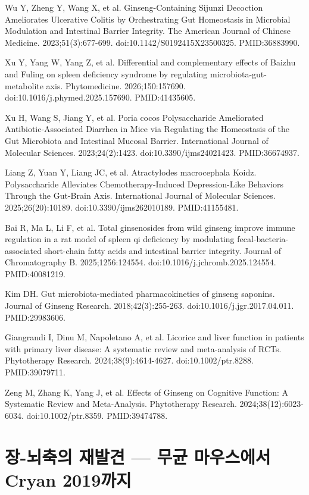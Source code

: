 \documentclass[12pt,oneside]{book}
\newcommand{\refend}{\endgroup\par}
\newcommand{\reff}[2]{\par\hangindent=7mm\hangafter=1\noindent[#1]\hspace{2mm}#2\par}
\begin{document}
\reff{54}{Wu Y, Zheng Y, Wang X, et al. Ginseng-Containing Sijunzi Decoction Ameliorates Ulcerative Colitis by Orchestrating Gut Homeostasis in Microbial Modulation and Intestinal Barrier Integrity. The American Journal of Chinese Medicine. 2023;51(3):677-699. doi:10.1142/S0192415X23500325. PMID:36883990.}

\reff{55}{Xu Y, Yang W, Yang Z, et al. Differential and complementary effects of Baizhu and Fuling on spleen deficiency syndrome by regulating microbiota-gut-metabolite axis. Phytomedicine. 2026;150:157690. doi:10.1016/j.phymed.2025.157690. PMID:41435605.}

\reff{56}{Xu H, Wang S, Jiang Y, et al. Poria cocos Polysaccharide Ameliorated Antibiotic-Associated Diarrhea in Mice via Regulating the Homeostasis of the Gut Microbiota and Intestinal Mucosal Barrier. International Journal of Molecular Sciences. 2023;24(2):1423. doi:10.3390/ijms24021423. PMID:36674937.}

\reff{57}{Liang Z, Yuan Y, Liang JC, et al. Atractylodes macrocephala Koidz. Polysaccharide Alleviates Chemotherapy-Induced Depression-Like Behaviors Through the Gut-Brain Axis. International Journal of Molecular Sciences. 2025;26(20):10189. doi:10.3390/ijms262010189. PMID:41155481.}

\reff{58}{Bai R, Ma L, Li F, et al. Total ginsenosides from wild ginseng improve immune regulation in a rat model of spleen qi deficiency by modulating fecal-bacteria-associated short-chain fatty acids and intestinal barrier integrity. Journal of Chromatography B. 2025;1256:124554. doi:10.1016/j.jchromb.2025.124554. PMID:40081219.}

\reff{59}{Kim DH. Gut microbiota-mediated pharmacokinetics of ginseng saponins. Journal of Ginseng Research. 2018;42(3):255-263. doi:10.1016/j.jgr.2017.04.011. PMID:29983606.}

\reff{60}{Giangrandi I, Dinu M, Napoletano A, et al. Licorice and liver function in patients with primary liver disease: A systematic review and meta-analysis of RCTs. Phytotherapy Research. 2024;38(9):4614-4627. doi:10.1002/ptr.8288. PMID:39079711.}

\reff{61}{Zeng M, Zhang K, Yang J, et al. Effects of Ginseng on Cognitive Function: A Systematic Review and Meta-Analysis. Phytotherapy Research. 2024;38(12):6023-6034. doi:10.1002/ptr.8359. PMID:39474788.}

\refend


\chapter{장-뇌축의 재발견 — 무균 마우스에서 Cryan 2019까지}
\end{document}
